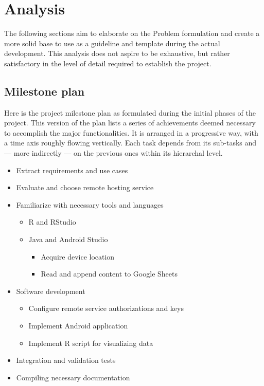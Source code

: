 \chapter{Analysis}
The following sections aim to elaborate on the Problem formulation and create a more solid base to use as a guideline and template during the actual development.
This analysis does not aspire to be exhaustive, but rather satisfactory in the level of detail required to establish the project.


\section{Milestone plan}
Here is the project milestone plan as formulated during the initial phases of the project.
This version of the plan lists a series of achievements deemed necessary to accomplish the major functionalities.
It is arranged in a progressive way, with a time axis roughly flowing vertically.
Each task depends from its sub-tasks and --- more indirectly --- on the previous ones within its hierarchal level.


\renewcommand{\labelitemi}{\textbullet}
\renewcommand{\labelitemii}{\textbullet}
\renewcommand{\labelitemiii}{\textbullet}
\renewcommand{\labelitemiv}{\textbullet}
\begin{itemize}
	\item Extract requirements and use cases
	\item Evaluate and choose remote hosting service
	\item Familiarize with necessary tools and languages
	\begin{itemize}
		\item R and RStudio
		\item Java and Android Studio
		\begin{itemize}
			\item Acquire device location
			\item Read and append content to Google Sheets
		\end{itemize}
	\end{itemize}
	\item Software development
	\begin{itemize}
		\item Configure remote service authorizations and keys
		\item Implement Android application
		\item Implement R script for visualizing data
	\end{itemize}
	\item Integration and validation tests
	\item Compiling necessary documentation
\end{itemize}


